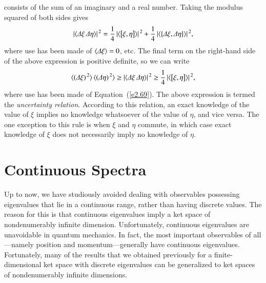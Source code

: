 consists of the sum of an  imaginary and a real number. 
Taking the modulus squared of both sides gives
\begin{equation}
|\langle{\mit\Delta} \xi \,{\mit\Delta} \eta\rangle|^{\,2}= \frac{1}{4}\, 
|\langle\left[\xi,  \eta\right]\rangle|^{\,2}
+\frac{1}{4}\, |\langle\left\{ {\mit\Delta} \xi, {\mit\Delta} \eta\right\}\rangle|^{\,2},
\end{equation}
where use has been made of $\langle {\mit\Delta}\xi\rangle = 0$, {\rm etc}.
The final term on the right-hand side of the above expression is positive definite, so we can write
\begin{equation}\label{e2.75}
\langle ({\mit\Delta} \xi)^{\,2}\rangle\, \langle ({\mit\Delta} \eta)^{\,2}\rangle  \geq |\langle
{\mit\Delta} \xi \,{\mit\Delta} \eta\rangle |^{\,2}\geq  \frac{1}{4} \,
|\langle\left[ \xi,  \eta\right]\rangle|^{\,2},
\end{equation}
where use has been made of Equation~(\ref{e2.69}). The above expression is termed the
{\em uncertainty relation}. According to this relation, an exact knowledge
of the value of $\xi$ implies no knowledge whatsoever of the value of $\eta$,
and {\rm vice versa}. The one exception to this rule is when $\xi$ and $\eta$
commute, in which case exact knowledge of $\xi$ does not necessarily imply
no knowledge of $\eta$. 

\section{Continuous Spectra}\label{s2.15}
Up to now, we have studiously avoided dealing with observables  possessing
eigenvalues that lie in a continuous range, rather than having discrete
values. The reason for this is that continuous eigenvalues imply a
ket space of  nondenumerably infinite dimension. Unfortunately, continuous
eigenvalues are unavoidable in quantum mechanics. In fact, the most important
observables of all---namely position and momentum---generally have continuous
eigenvalues. Fortunately, many of the results that we obtained previously
for a finite-dimensional ket space with discrete eigenvalues can be
generalized to ket spaces of nondenumerably infinite dimensions.

